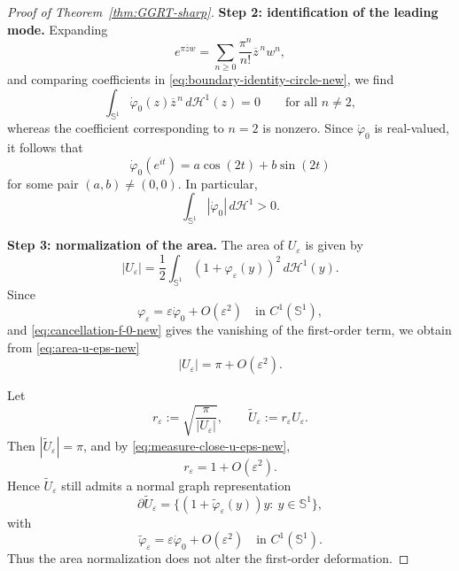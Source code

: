 \documentclass[a4paper,11pt,reqno]{amsart}
\numberwithin{equation}{section}
\theoremstyle{plain} %
\theoremstyle{definition} %
\theoremstyle{remark}
\begin{document}
\begin{proof}[Proof of Theorem~\ref{thm:GGRT-sharp}]
\medskip
\noindent
{\bf Step 2: identification of the leading mode.} Expanding
\[
e^{\pi \overline zw}
=
\sum_{n\geq 0}\frac{\pi^n}{n!}\overline z^{\,n}w^n,
\]
and comparing coefficients in \eqref{eq:boundary-identity-circle-new}, we find
\[
\int_{\mathbb S^1}\dot\varphi_0(z)\overline z^{\,n}\,d\mathcal H^1(z)=0
\qquad \text{for all } n\neq 2,
\]
whereas the coefficient corresponding to $n=2$ is nonzero. Since
$\dot\varphi_0$ is real-valued, it follows that
\begin{equation}\label{eq:mode-decomposition-new}
\dot\varphi_0(e^{it})
=
a\cos(2t)+b\sin(2t)
\end{equation}
for some pair $(a,b)\neq (0,0)$. In particular,
\begin{equation}\label{eq:l1-nontrivial-new}
\int_{\mathbb S^1} |\dot\varphi_0|\,d\mathcal H^1>0.
\end{equation}

\medskip
\noindent
{\bf Step 3: normalization of the area.} The area of $U_\varepsilon$ is given by
\begin{equation}\label{eq:area-u-eps-new}
|U_\varepsilon|
=
\frac12\int_{\mathbb S^1} (1+\varphi_\varepsilon(y))^2\,d\mathcal H^1(y).
\end{equation}
Since
\[
\varphi_\varepsilon
=
\varepsilon \dot\varphi_0 + O(\varepsilon^2)
\quad \text{in } C^1(\mathbb S^1),
\]
and \eqref{eq:cancellation-f-0-new} gives the vanishing of the first-order
term, we obtain from \eqref{eq:area-u-eps-new}
\begin{equation}\label{eq:measure-close-u-eps-new}
|U_\varepsilon|=\pi+O(\varepsilon^2).
\end{equation}

Let
\[
r_\varepsilon:=\sqrt{\frac{\pi}{|U_\varepsilon|}},
\qquad
\widetilde U_\varepsilon:=r_\varepsilon U_\varepsilon.
\]
Then $|\widetilde U_\varepsilon|=\pi$, and by
\eqref{eq:measure-close-u-eps-new},
\[
r_\varepsilon=1+O(\varepsilon^2).
\]
Hence $\widetilde U_\varepsilon$ still admits a normal graph representation
\[
\partial \widetilde U_\varepsilon
=
\{(1+\widetilde\varphi_\varepsilon(y))y:\ y\in \mathbb S^1\},
\]
with
\[
\widetilde\varphi_\varepsilon
=
\varepsilon \dot\varphi_0 + O(\varepsilon^2)
\quad \text{in } C^1(\mathbb S^1).
\]
Thus the area normalization does not alter the first-order deformation.


\end{proof}
\end{document}
